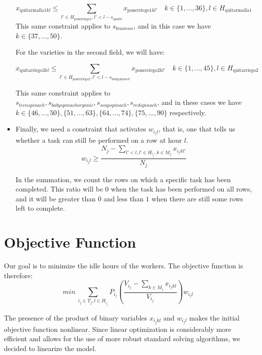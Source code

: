 \begin{itemize}
        \[
	        x_{\text{quitarmalla}1 kl} \leq \sum_{l'\in H_{\text{ponerriego}1}, l'<l-s_{apollo}}x_{\text{ponerriego}1kl'} \quad k\in \{1, ..., 36\}, l\in H_{\text{quitarmalla}1}
        \]
	    This same constraint applies to $s_{knoxcos}$, and in this case we have $k \in \{37, ..., 50\}$.

        For the varieties in the second field, we will have:

        \[
	        x_{\text{quitarriego}2 kl} \leq \sum_{l'\in H_{\text{ponerriego}2}, l'<l-s_{babyspinach}}x_{\text{ponerriego}2kl'} \quad k\in \{1, ..., 45\}, l\in H_{\text{quitarriego}2}
        \]

        This same constraint applies to $s_{teenspinach}, s_{babyspinachorganic}, s_{soupspinach}, s_{redspinach}$, and in these cases we have $k \in \{46, ..., 50\}, \{51, ..., 63\}, \{64, ..., 74\}, \{75, ..., 90\}$ respectively.


        \item Finally, we need a constraint that activates $w_{i_j l}$, that is, one that tells us whether a task can still be performed on a row at hour $l$.
        \[
	        \displaystyle w_{i_j l}\geq \frac{N_j-\sum_{l'<l, l'\in H_{i_j}, k\in M_j}x_{i_j kl'}}{N_j}
        \]
	
        In the summation, we count the rows on which a specific task has been completed.  This ratio will be $0$ when the task has been performed on all rows, and it will be greater than $0$ and less than $1$ when there are still some rows left to complete.
            
\end{itemize}


    \section*{Objective Function}

    Our goal is to minimize the idle hours of the workers. The objective function is therefore:
	\[
	    min\ \sum_{i_j \in T_j, l\in H_{i_j}}P_{i_j}\left(\frac{V_{i_j}-\sum_{k\in M_j}x_{i_j kl}}{V_{i_j}}\right)w_{i_j l}
    \]

    The presence of the product of binary variables $x_{i_j kl}$ and $w_{i_j l}$ makes the initial objective function nonlinear.  
    Since linear optimization is considerably more efficient and allows for the use of more robust standard solving algorithms,  
    we decided to linearize the model.

